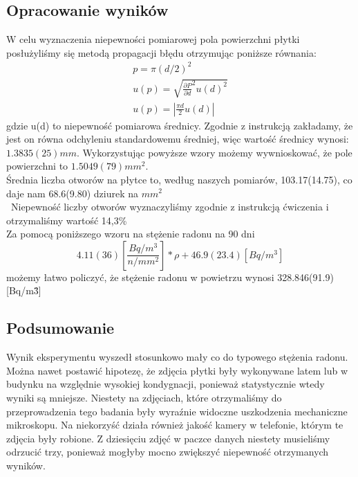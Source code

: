 \documentclass{article}
\begin{document}
\clearpage

\subsection{Opracowanie wyników}
W celu wyznaczenia niepewności pomiarowej pola powierzchni płytki posłużyliśmy się metodą propagacji błędu otrzymując poniższe równania:
\begin{gather*}
p = \pi (d/2)^2 \\
u(p)=\sqrt{\frac{\partial P}{\partial d}^2 u(d)^2 }\\
u(p)=|\frac{\pi d}{2}u(d)|
\end{gather*}
gdzie u(d) to niepewność pomiarowa średnicy. Zgodnie z instrukcją zakładamy, że jest on równa odchyleniu standardowemu średniej, więc wartość średnicy wynosi: $1.3835(25) mm$. Wykorzystując powyższe wzory możemy wywnioskować, że pole powierzchni to $1.5049(79) mm^2$. \\
Średnia liczba otworów na płytce to, według naszych pomiarów, 103.17(14.75), co daje nam 68.6(9.80) dziurek na $mm^2$ \\\
Niepewność liczby otworów wyznaczyliśmy zgodnie z instrukcją ćwiczenia i otrzymaliśmy wartość 14,3\% \\
Za pomocą poniższego wzoru na stężenie radonu na 90 dni 
$$
4.11(36)[\frac{Bq/m^3}{n/mm^2}] * \rho + 46.9(23.4)[Bq/m^3]
$$
możemy łatwo policzyć, że stężenie radonu w powietrzu wynosi 328.846(91.9) [Bq/m\^3]
\subsection{Podsumowanie}
Wynik eksperymentu wyszedł stosunkowo mały co do typowego stężenia radonu. Można nawet postawić hipotezę, że zdjęcia płytki były wykonywane latem lub w budynku na względnie wysokiej kondygnacji, ponieważ statystycznie wtedy wyniki są mniejsze. Niestety na zdjęciach, które otrzymaliśmy do przeprowadzenia tego badania były wyraźnie widoczne uszkodzenia mechaniczne mikroskopu. Na niekorzyść działa również jakość kamery w telefonie, którym te zdjęcia były robione. Z dziesięciu zdjęć w paczce danych niestety musieliśmy odrzucić trzy, ponieważ mogłyby mocno zwiększyć niepewność otrzymanych wyników.
\end{document}
